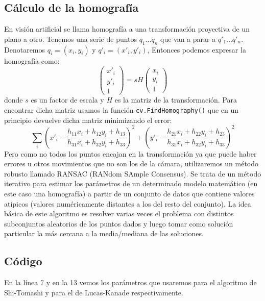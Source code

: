 \documentclass[a4paper,openright, 12pt]{book}
\begin{document}
\subsection{Cálculo de la homografía}
En visión artificial se llama homografía a una transformación proyectiva de un plano a otro.
\newline
Tenemos una serie de puntos $q_1 \ldots q_n$ que van a parar a $q'_1 \ldots q'_n$. Denotaremos $q_i = (x_i,y_i)$ y $q'_i=(x'_i, y'_i)$,
Entonces podemos expresar la homografía como:
\begin{equation}
        \left( \begin{array}{c}
        x'_i\\
        y'_i\\
        1
        \end{array} \right)
        = sH
                \left( \begin{array}{c}
        x_i\\
        y_i\\
        1
        \end{array} \right)
\end{equation}
donde $s$ es un factor de escala y $H$ es la matriz de la transformación.
Para encontrar dicha matriz usamos la función \lstinline|cv.FindHomography()|
que en un principio devuelve dicha matriz minimizando el error:
\begin{equation*}
\sum_i \left( x'_i - \dfrac{h_{11}x_i + h_{12}y_i + h_{13}}{h_{31}x_i + h_{32}y_i + h_{33}} \right) ^2  
+ 
\left( y'_i - \dfrac{h_{21}x_i + h_{22}y_i + h_{23}}{h_{31}x_i + h_{32}y_i + h_{33}} \right) ^2 
\end{equation*}
Pero como no todos los puntos encajan en la transformación ya que puede haber errores u otros movimientos que no son los de la cámara, utilizaremos un método robusto llamado RANSAC (RANdom SAmple Consensus). Se trata de un método iterativo para estimar los parámetros de un determinado modelo matemático (en este caso una homografía) a partir de un conjunto de datos que contiene valores atípicos (valores numéricamente distantes a los del resto del conjunto). La idea básica de este algoritmo es resolver varias veces el problema con distintos subconjuntos aleatorios de los puntos dados y luego tomar como solución particular la más cercana a la media/mediana de las soluciones.
\newpage
\subsection{Código}

En la línea 7 y en la 13 vemos los parámetros que usaremos para el algoritmo de Shi-Tomashi y para el de Lucas-Kanade respectivamente.
\end{document}
